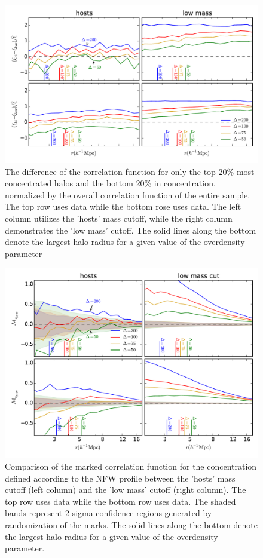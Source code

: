 \documentclass[usenatbib,usegraphicx,letterpaper]{mn2e}
\begin{document}
\begin{figure}
	\centering
	\includegraphics[width=\textwidth]{all_cfhilow_z00_hostsvlow.pdf}
	\caption{The difference of the correlation function for only the top 20\% most concentrated halos and the bottom 20\% in concentration, normalized by the overall correlation function of the entire sample. The top row uses \simA data while the bottom rose uses \simB data. The left column utilizes the 'hosts' mass cutoff, while the right column demonstrates the 'low mass' cutoff. The solid lines along the bottom denote the largest halo radius for a given value of the overdensity parameter}
	\label{fig:hvl_cfcompare}
\end{figure}

\begin{figure}
	\centering
	\includegraphics[width=\textwidth]{all_mcf_cnfw_z00_hostsvlow.pdf}
	\caption{Comparison of the marked correlation function for the concentration defined according to the NFW profile between the 'hosts' mass cutoff (left column) and the 'low mass' cutoff (right column). The top row uses \simA data while the bottom row uses \simB data. The shaded bands represent 2-sigma confidence regions generated by randomization of the marks. The solid lines along the bottom denote the largest halo radius for a given value of the overdensity parameter.}
	\label{fig:hvl_mcf_cnfw}
\end{figure}
\end{document}
